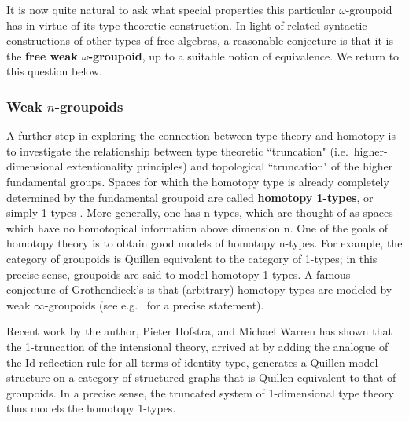 \documentclass[reqno,12pt]{amsart}
\newcommand{\myemph}[1]{\textbf{#1}}    %
\theoremstyle{definition}
\theoremstyle{remark}
\begin{document}
It is now quite natural to ask what special properties this particular $\omega$-groupoid has in virtue of its type-theoretic construction.  In light of related syntactic constructions of other types of free algebras, a reasonable conjecture is that it is the \myemph{free weak $\omega$-groupoid}, up to a suitable notion of equivalence.  We return to this question below.

\subsubsection{Weak $n$-groupoids}

A further step in exploring the connection between type theory and homotopy is to investigate the relationship between type theoretic ``truncation" (i.e.\ higher-dimensional extentionality principles) and topological ``truncation" of the higher fundamental groups. Spaces for which the homotopy type is already completely determined by the fundamental groupoid are called \myemph{homotopy 1-types}, or simply 1-types \cite{Baues:HT}. More generally, one has n-types, which are thought of as spaces which have no homotopical information above dimension n. One of the goals of homotopy theory is to obtain good models of homotopy n-types.  For example, the category of groupoids is Quillen equivalent to the category of 1-types; in this precise sense, groupoids are said to model homotopy 1-types.  A famous conjecture of Grothendieck's is that (arbitrary) homotopy types are modeled by weak $\infty$-groupoids (see e.g.~\cite{Batanin:MGCNETWNC} for a precise statement).

Recent work \cite{AHW:MLC} by the author, Pieter Hofstra, and Michael Warren has shown that the 1-truncation of the intensional theory, arrived at by adding the analogue of the Id-reflection rule for all terms of identity type, generates a Quillen model structure on a category of structured graphs that is Quillen equivalent to that of groupoids.  In a precise sense, the truncated system of 1-dimensional type theory thus models the homotopy 1-types.

\end{document}
